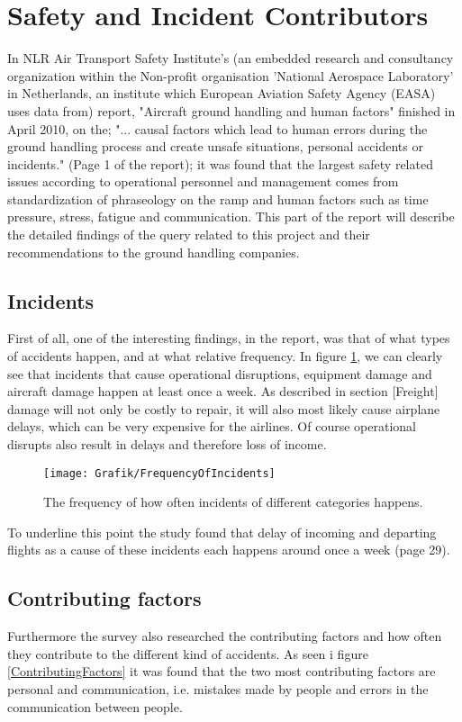 \section{Safety and Incident Contributors}
In NLR Air Transport Safety Institute's (an embedded research and consultancy organization within the Non-profit organisation 'National Aerospace Laboratory' in Netherlands, an institute which European Aviation Safety Agency (EASA) uses data from) report\cite{NLR_human_factors}, "Aircraft ground handling and human factors" finished in April 2010, on the; "... causal factors which lead to human errors during the ground handling process and create unsafe situations, personal accidents or incidents." (Page 1 of the report); it was found that the largest safety related issues according to operational personnel and management comes from standardization of phraseology on the ramp and human factors such as time pressure, stress, fatigue and communication. This part of the report will describe the detailed findings of the query related to this project and their recommendations to the ground handling companies.

\subsection{Incidents}
First of all, one of the interesting findings, in the report, was that of what types of accidents happen, and at what relative frequency. In figure \ref{FrequencyOfIncidents}, we can clearly see that incidents that cause operational disruptions, equipment damage and aircraft damage happen at least once a week. As described in section [Freight] damage will not only be costly to repair, it will also most likely cause airplane delays, which can be very expensive for the airlines. Of course operational disrupts also result in delays and therefore loss of income.

\begin{figure}[H]
\centering
\texttt{[image: Grafik/FrequencyOfIncidents]}
\caption{The frequency of how often incidents of different categories happens.}
\label{FrequencyOfIncidents}
\end{figure}

To underline this point the study found that delay of incoming and departing flights as a cause of these incidents each happens around once a week (page 29).

\subsection{Contributing factors} %
Furthermore the survey also researched the contributing factors and how often they contribute to the different kind of accidents. As seen i figure \ref{ContributingFactors} it was found that the two most contributing factors are personal and communication, i.e. mistakes made by people and errors in the communication between people.

